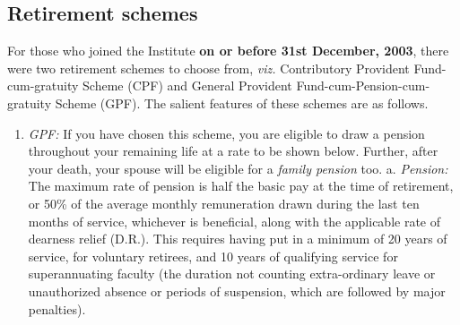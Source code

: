 \documentclass[
  10pt,
  a5paper,
  10pt,
  openany]{amsbook}
\providecommand{\tightlist}{%
  \setlength{\itemsep}{0pt}\setlength{\parskip}{0pt}}
\begin{document}
\subsection{Retirement schemes}\label{retirement-schemes}

For those who joined the Institute \textbf{on or before 31st December,
2003}, there were two retirement schemes to choose from, \emph{viz.}
Contributory Provident Fund-cum-gratuity Scheme (CPF) and General
Provident Fund-cum-Pension-cum-gratuity Scheme (GPF). The salient
features of these schemes are as follows.

\begin{enumerate}
\def\labelenumi{\arabic{enumi}.}
\tightlist
\item
  \emph{GPF:} If you have chosen this scheme, you are eligible to draw a
  pension throughout your remaining life at a rate to be shown below.
  Further, after your death, your spouse will be eligible for a
  \emph{family pension} too. a. \emph{Pension:} The maximum rate of
  pension is half the basic pay at the time of retirement, or 50\% of
  the average monthly remuneration drawn during the last ten months of
  service, whichever is beneficial, along with the applicable rate of
  dearness relief (D.R.). This requires having put in a minimum of 20
  years of service, for voluntary retirees, and 10 years of qualifying
  service for superannuating faculty (the duration not counting
  extra-ordinary leave or unauthorized absence or periods of suspension,
  which are followed by major penalties).
\end{enumerate}
\end{document}
